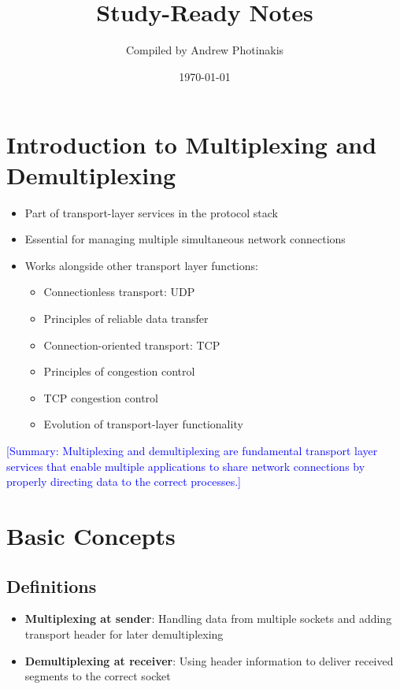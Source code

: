 \documentclass[12pt]{article}
\title{\TOPICTITLE\\\large Study-Ready Notes}
\author{Compiled by Andrew Photinakis}
\date{\today}
\begin{document}
\maketitle
\tableofcontents
\newpage


\section{Introduction to Multiplexing and Demultiplexing}

\begin{itemize}
    \item Part of transport-layer services in the protocol stack
    \item Essential for managing multiple simultaneous network connections
    \item Works alongside other transport layer functions:
          \begin{itemize}
              \item Connectionless transport: UDP
              \item Principles of reliable data transfer
              \item Connection-oriented transport: TCP
              \item Principles of congestion control
              \item TCP congestion control
              \item Evolution of transport-layer functionality
          \end{itemize}
\end{itemize}

\textcolor{blue}{[Summary: Multiplexing and demultiplexing are fundamental transport layer services that enable multiple applications to share network connections by properly directing data to the correct processes.]}

\section{Basic Concepts}

\subsection{Definitions}
\begin{itemize}
    \item \textbf{Multiplexing at sender}: Handling data from multiple sockets and adding transport header for later demultiplexing
    \item \textbf{Demultiplexing at receiver}: Using header information to deliver received segments to the correct socket
\end{itemize}
\end{document}
